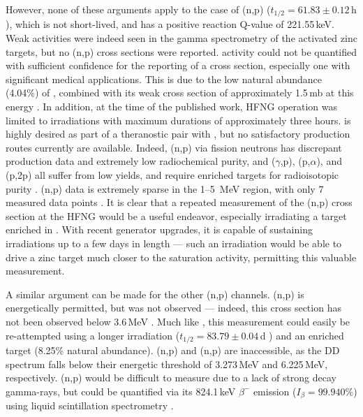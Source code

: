 However, none of these arguments apply to the case of (n,p) ($t_{1/2}=61.83\pm0.12$\,h \cite{Junde2005}), which is not short-lived, and has a positive reaction Q-value of 221.55\,keV.
Weak   activities were indeed seen in the gamma spectrometry of the activated zinc targets, but no (n,p) cross sections were reported.
 activity could not be quantified with sufficient confidence for the reporting of a cross section, especially one with significant medical applications. 
This is due to the low natural abundance (4.04\%)  of , combined with its weak cross section of approximately 1.5\,mb at this energy \cite{Shimizu2004975}.
In addition, at the time of the published work, HFNG operation was limited to irradiations with maximum durations of approximately three hours.
 is highly desired as part of a theranostic pair with , but no satisfactory production routes currently are available.
Indeed, (n,p) via fission neutrons has discrepant production data and extremely low radiochemical purity, and ($\gamma$,p), (p,$\alpha$), and (p,2p) all suffer from low yields, and require enriched targets for radioisotopic purity \cite{Qaim201731}.
(n,p) data is extremely sparse in the 1--5\, MeV region, with only 7 measured data points \cite{VanLoef1961,Shimizu2004975,Furuta2008,Bhike2009}.
It is clear that a repeated measurement of the (n,p) cross section at the HFNG would be a useful endeavor, especially irradiating a target enriched in .
With recent generator upgrades, it is capable of sustaining irradiations up to a few days in length --- such an irradiation would be able to drive a zinc target much closer to the  saturation activity, permitting this valuable measurement.





A similar argument can be made for the other (n,p) channels.
(n,p) is energetically permitted, but was not observed --- indeed, this cross section has not been observed below 3.6\,MeV \cite{Smith1975}.
Much like , this measurement could easily be re-attempted using a longer irradiation ($t_{1/2}=83.79\pm0.04$\,d \cite{Wu2000}) and an enriched target (8.25\%  natural  abundance).
(n,p) and (n,p) are inaccessible, as the DD spectrum falls below their energetic threshold of 3.273\,MeV and 6.225\,MeV, respectively.
(n,p) would be difficult to measure due to a lack of strong decay gamma-rays, but could be quantified via its 824.1\,keV $\beta^-$ emission ($I_\beta=99.940\%$) using liquid scintillation spectrometry  \cite{Burrows2008}.


